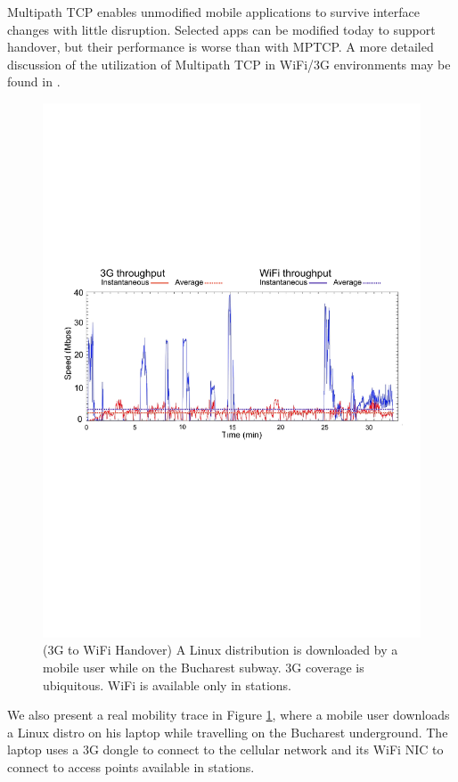 Multipath TCP enables unmodified mobile applications to survive interface changes with
little disruption. Selected apps can be modified today to support handover, but their performance
is worse than with MPTCP. A more detailed discussion of the utilization of
Multipath TCP in WiFi/3G environments may be found in \cite{Paasch_Mobile:2012}.

\begin{figure}[t]
\centering
\includegraphics[width=\textwidth,trim=0 11cm 0 9cm,clip=true]{figures/throughput-subway}
\caption{(3G to WiFi Handover) A Linux distribution is downloaded by a mobile user while on the Bucharest subway. 3G coverage is ubiquitous. WiFi is available only in stations.}
\label{fig:throughput-subway}
\end{figure}

We also present a real mobility trace in Figure \ref{fig:throughput-subway}, where a mobile user downloads a Linux distro on his laptop
while travelling on the Bucharest underground. The laptop uses a 3G dongle to connect to the cellular network and its WiFi NIC to connect 
to access points available in stations. 

